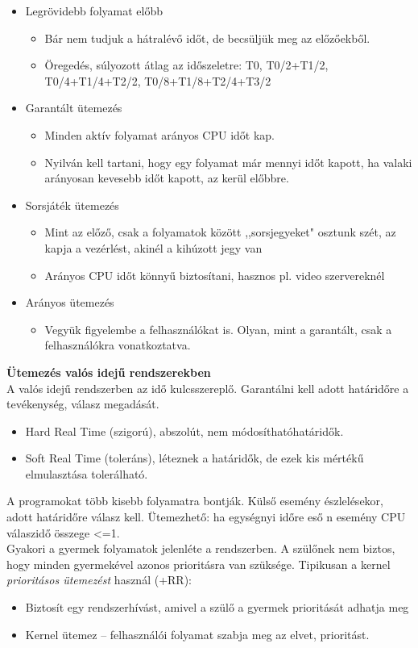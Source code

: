 \documentclass[margin=0px]{article}
\begin{document}
\begin{itemize}
    \item Legrövidebb folyamat előbb
          \begin{itemize}
              \item Bár nem tudjuk a hátralévő időt, de becsüljük meg az előzőekből.
              \item Öregedés, súlyozott átlag az időszeletre: T0, T0/2+T1/2, T0/4+T1/4+T2/2, T0/8+T1/8+T2/4+T3/2
          \end{itemize}
    \item Garantált ütemezés
          \begin{itemize}
              \item Minden aktív folyamat arányos CPU időt kap.
              \item Nyilván kell tartani, hogy egy folyamat már mennyi időt kapott, ha valaki arányosan kevesebb időt kapott, az kerül előbbre.
          \end{itemize}
    \item Sorsjáték ütemezés
          \begin{itemize}
              \item Mint az előző, csak a folyamatok között ,,sorsjegyeket" osztunk szét, az kapja a vezérlést, akinél a kihúzott jegy van
              \item Arányos CPU időt könnyű biztosítani, hasznos pl. video szervereknél
          \end{itemize}
    \item Arányos ütemezés
          \begin{itemize}
              \item Vegyük figyelembe a felhasználókat is. Olyan, mint a garantált, csak a felhasználókra vonatkoztatva.
          \end{itemize}
\end{itemize}
\textbf{Ütemezés valós idejű rendszerekben} \\
A valós idejű rendszerben az idő kulcsszereplő. Garantálni kell adott határidőre a tevékenység, válasz megadását.
\begin{itemize}
    \item Hard Real Time (szigorú), abszolút, nem módosíthatóhatáridők.
    \item Soft Real Time (toleráns), léteznek a határidők, de ezek kis mértékű elmulasztása tolerálható.
\end{itemize}
A programokat több kisebb folyamatra bontják. Külső esemény észlelésekor, adott határidőre válasz
kell. Ütemezhető: ha egységnyi időre eső n esemény CPU válaszidő összege <=1. \\
Gyakori a gyermek folyamatok jelenléte a rendszerben. A szülőnek nem biztos, hogy minden
gyermekével azonos prioritásra van szüksége. Tipikusan a kernel \textit{prioritásos ütemezést}
használ (+RR):
\begin{itemize}
    \item Biztosít egy rendszerhívást, amivel a szülő a gyermek prioritását adhatja meg
    \item Kernel ütemez -- felhasználói folyamat szabja meg az elvet, prioritást.
\end{itemize}
\end{document}
